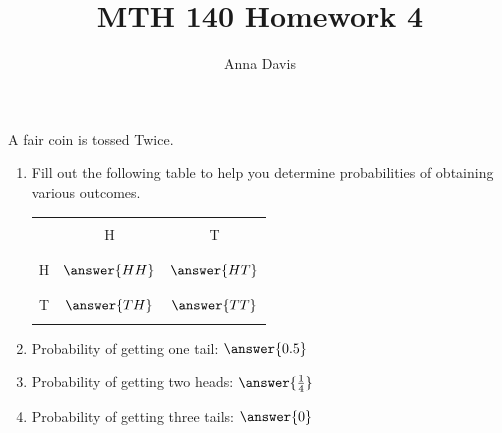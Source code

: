 \documentclass{ximera}
\author{Anna Davis} \title{MTH 140 Homework 4}
\begin{document}
\begin{abstract}

\end{abstract}
\maketitle
 
 \begin{problem}\label{prob:140hom4prob1}
A fair coin is tossed Twice.  
\begin{enumerate}
    \item Fill out the following table to help you determine probabilities of obtaining various outcomes.
    
\begin{center}
\begin{tabular}{|c|c|c|}
 \hline
 &&   \\
 & H& T  \\
 &&   \\
  \hline
  &&\\
 H&$\answer{HH}$&$\answer{HT}$ \\
  && \\
 \hline
  &&\\
 T&$\answer{TH}$&$\answer{TT}$ \\
  && \\
 \hline
 \end{tabular}
\end{center}    
\item Probability of getting one tail: $\answer{0.5}$

\item Probability of getting two heads: $\answer{\frac{1}{4}}$
\item Probability of getting three tails: $\answer{0}$
\end{enumerate}
\end{problem}
\end{document}
